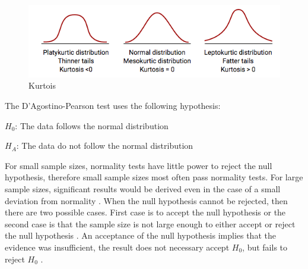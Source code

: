 \begin{figure}[h!]
	\centering
	\includegraphics[width=0.7\linewidth]{fig/kurtois}
	\caption{Kurtois \citep{MedCalcSoftwarebvba2017}}
	\label{fig:kurtois}
\end{figure}


The D'Agostino-Pearson test uses the following hypothesis:\newline

\centerline{$H_{0}$: The data follows the normal distribution} 
\centerline{$H_{A}$: The data do not follow the normal distribution}

For small sample sizes, normality tests have little power to reject the null hypothesis, therefore small sample sizes most often pass normality tests. For large sample sizes, significant results would be derived even in the case of a small deviation from normality \citep{Pearson2006}. When the null hypothesis cannot be rejected, then there are two possible cases. First case is to accept the null hypothesis or the second case is that the sample size is not large enough to either accept or reject the null hypothesis \citep{ThePennsylvaniaStateUniversity2017}. An acceptance of the null hypothesis implies that the evidence was insufficient, the result does not necessary accept $H_{0}$, but fails to reject $H_{0}$ \citep{Walpole2012}.  




